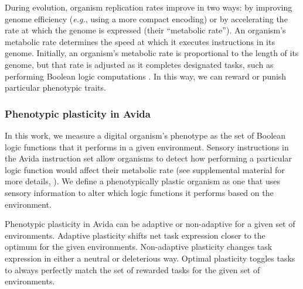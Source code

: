
During evolution, organism replication rates improve in two ways: by improving genome efficiency (\textit{e.g.}, using a more compact encoding) or by accelerating the rate at which the genome is expressed (their ``metabolic rate'').
An organism's metabolic rate determines the speed at which it executes instructions in its genome.
Initially, an organism's metabolic rate is proportional to the length of its genome, but that rate is adjusted as it completes designated tasks, such as performing Boolean logic computations \citep{ofria_avida:_2009}.
In this way, we can reward or punish particular phenotypic traits. 

\subsubsection{Phenotypic plasticity in Avida}

In this work, we measure a digital organism's phenotype as the set of Boolean logic functions that it performs in a given environment.
Sensory instructions in the Avida instruction set allow organisms to detect how performing a particular logic function would affect their metabolic rate (see supplemental material for more details, \citealt{supplemental_material}). 
We define a phenotypically plastic organism as one that uses sensory information to alter which logic functions it performs based on the environment.

Phenotypic plasticity in Avida can be adaptive or non-adaptive for a given set of environments.
Adaptive plasticity shifts net task expression closer to the optimum for the given environments.
Non-adaptive plasticity changes task expression in either a neutral or deleterious way. 
Optimal plasticity toggles tasks to always perfectly match the set of rewarded tasks for the given set of environments.


